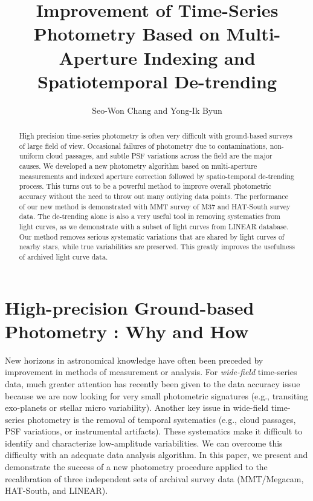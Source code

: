 
\resetcounters



\title{Improvement of Time-Series Photometry Based on Multi-Aperture
Indexing and Spatiotemporal De-trending}
\author{Seo-Won Chang and Yong-Ik Byun}


\begin{abstract}
High precision time-series photometry is often very difficult with ground-based surveys of large field of view.  Occasional failures of photometry due to contaminations, non-uniform cloud passages, and subtle PSF variations across the field are the major causes.  We developed a new photometry algorithm based on multi-aperture measurements and indexed aperture correction followed by spatio-temporal de-trending process.  This turns out to be a powerful method to improve overall photometric accuracy without the need to throw out many outlying data points.  The performance of our new method is demonstrated with MMT survey of M37 and HAT-South survey data.  The de-trending alone is also a very useful tool in removing systematics from light curves, as we demonstrate with a subset of light curves from LINEAR database.  Our method removes serious systematic variations that are shared by light curves of nearby stars, while true variabilities are preserved.  This greatly improves the usefulness of archived light curve data.
\end{abstract}


\section{High-precision Ground-based Photometry : Why and How}
New horizons in astronomical knowledge have often been preceded by improvement in methods of measurement or analysis.  For {\itshape wide-field} time-series data, much greater attention has recently been given to the data accuracy issue because we are now looking for very small photometric signatures (e.g., transiting exo-planets or stellar micro variability).  Another key issue in wide-field time-series photometry is the removal of temporal systematics (e.g., cloud passages, PSF variations, or instrumental artifacts).  These systematics make it difficult to identify and characterize low-amplitude variabilities.  We can overcome this difficulty with an adequate data analysis algorithm.  In this paper, we present and demonstrate the success of a new photometry procedure applied to the recalibration of three independent sets of archival survey data (MMT/Megacam, HAT-South, and LINEAR).

